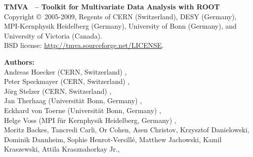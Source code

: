 \begin{center}
{\small\sf
{\sf\bfseries TMVA \TMVAVersion\ -- Toolkit for Multivariate Data Analysis with ROOT}  \\
Copyright 
\copyright\  2005-2009, Regents of 
CERN (Switzerland),  
DESY (Germany),
MPI-Kernphysik Heidelberg (Germany),
University of Bonn (Germany),
and University of Victoria (Canada). \\
BSD license: \url{http://tmva.sourceforge.net/LICENSE}. 

{\sf\bfseries Authors:} \\
Andreas Hoecker (CERN, Switzerland) , \\
Peter Speckmayer (CERN, Switzerland) , \\
J\"org Stelzer (CERN, Switzerland) ,\\
Jan Therhaag (Universit\"at Bonn, Germany) , \\
Eckhard von Toerne (Universit\"at Bonn, Germany) ,\\
Helge Voss (MPI f\"ur Kernphysik Heidelberg, Germany) ,\\
Moritz Backes,%
Tancredi Carli,%
Or Cohen,%
Asen Christov,%
Krzysztof Danielowski,%
Dominik Dannheim,%
Sophie Henrot-Versill\'e,%
Matthew Jachowski,%
Kamil Kraszewski,%
Attila Krasznahorkay Jr.,%
}
\end{center}

